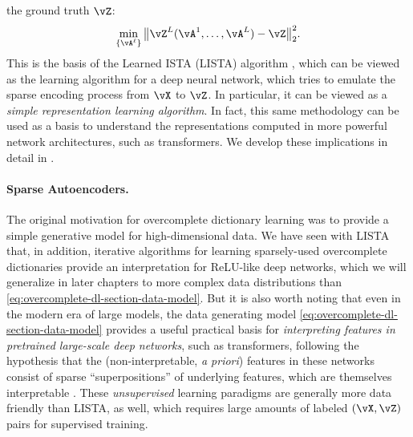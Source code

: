 \documentclass[../../book-main.tex]{subfiles}
\begin{document}
    the ground truth $\vZ$:
    \begin{equation}\label{eq:lista-training}
        \min_{\{\vA^\ell\}} \big\|\vZ^L(\vA^1, \ldots, \vA^{L}) - \vZ\big\|_2^2.
    \end{equation}
    This is the basis of the Learned ISTA (LISTA) algorithm
    \cite{gregor2010learning}, which can be viewed as the learning
    algorithm for a deep  neural network, which tries to emulate the
    sparse encoding process from $\vX$ to $\vZ$. In particular, it
    can be viewed as a \textit{simple representation learning algorithm}.
    In fact, this same methodology can be used as a basis to understand the
    representations computed in more powerful network architectures, such as
    transformers. We develop these implications in detail in
    .

    \paragraph{Sparse Autoencoders.}
    The original motivation for overcomplete dictionary learning was to provide
    a simple generative model for high-dimensional data. We have seen
    with LISTA that, in
    addition, iterative algorithms for learning sparsely-used overcomplete
    dictionaries provide an interpretation for ReLU-like deep networks, which we
    will generalize in later chapters to more complex data distributions than
    \eqref{eq:overcomplete-dl-section-data-model}.
    But it is also worth noting that even in the modern era of large
    models, the data
    generating model \eqref{eq:overcomplete-dl-section-data-model}
    provides a useful
    practical basis for
    \textit{interpreting features in pretrained large-scale deep
    networks}, such as
    transformers, following the hypothesis that the
    (non-interpretable, \textit{a
    priori}) features in these networks consist of sparse ``superpositions'' of
    underlying features, which are themselves interpretable
    \cite{elhage2022superposition}. These \textit{unsupervised}
    learning paradigms
    are generally more data friendly than LISTA, as well, which
    requires large amounts
    of labeled $(\vX, \vZ)$ pairs for supervised training.
\end{document}
